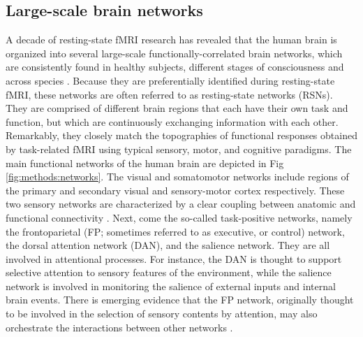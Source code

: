 \subsection{Large-scale brain networks}
\label{sec:fmri:fc:network}

A decade of resting-state fMRI research has revealed that the human brain is organized into several large-scale functionally-correlated brain networks, which are consistently found in healthy subjects, different stages of consciousness and across species \citep{fox_spontaneous_2007, yeo_organization_2011}. Because they are preferentially identified during resting-state fMRI, these networks are often referred to as resting-state networks (RSNs). They are comprised of different brain regions that each have their own task and function, but which are continuously exchanging information with each other. Remarkably, they closely match the topographies of functional responses obtained by task-related fMRI using typical sensory, motor, and cognitive paradigms.
The main functional networks of the human brain are depicted in Fig \ref{fig:methods:networks}. The visual and somatomotor networks include regions of the primary and secondary visual and sensory-motor cortex respectively. These two sensory networks are characterized by a clear coupling between anatomic and functional connectivity \citep{van_dijk_intrinsic_2010}. Next, come the so-called task-positive networks, namely the frontoparietal (FP; sometimes referred to as executive, or control) network, the dorsal attention network (DAN), and the salience network. They are all involved in attentional processes. For instance, the DAN is thought to support selective attention to sensory features of the environment, while the salience network is involved in monitoring the salience of external inputs and internal brain events. There is emerging evidence that the FP network, originally thought to be involved in the selection of sensory contents by attention, may also orchestrate the interactions between other networks \citep{christoff_mind-wandering_2016}.

